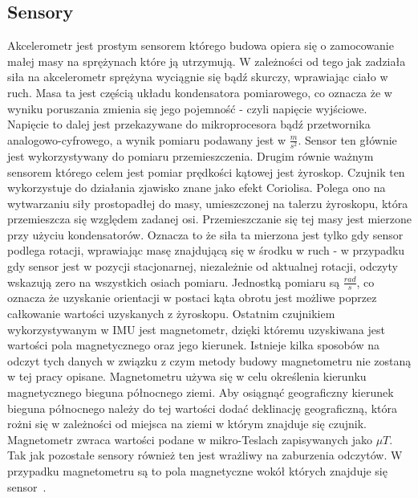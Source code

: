 		\subsection{Sensory}
		\label{subsec:sensory}
		Akcelerometr jest prostym sensorem którego budowa opiera się o zamocowanie małej masy na sprężynach które ją utrzymują. W zależności od tego jak zadziała siła na akcelerometr sprężyna wyciągnie się bądź skurczy, wprawiając ciało w ruch. Masa ta jest częścią układu kondensatora pomiarowego, co oznacza że w wyniku poruszania zmienia się jego pojemność - czyli napięcie wyjściowe. Napięcie to dalej jest przekazywane do mikroprocesora bądź przetwornika analogowo-cyfrowego, a wynik pomiaru podawany jest w {\Large$\frac{m}{s^2}$}. Sensor ten głównie jest wykorzystywany do pomiaru przemieszczenia. Drugim równie ważnym sensorem którego celem jest pomiar prędkości kątowej jest żyroskop. Czujnik ten wykorzystuje do działania zjawisko znane jako efekt Coriolisa. Polega ono na wytwarzaniu siły prostopadłej do masy, umieszczonej na talerzu żyroskopu, która przemieszcza się względem zadanej osi. Przemieszczanie się tej masy jest mierzone przy użyciu kondensatorów. Oznacza to że siła ta mierzona jest tylko gdy sensor podlega rotacji, wprawiając masę znajdującą się w środku w ruch - w przypadku gdy sensor jest w pozycji stacjonarnej, niezależnie od aktualnej rotacji, odczyty wskazują zero na wszystkich osiach pomiaru. Jednostką pomiaru są {\Large $\frac{rad}{s}$}, co oznacza że uzyskanie orientacji w postaci kąta obrotu jest możliwe poprzez całkowanie wartości uzyskanych z żyroskopu. Ostatnim czujnikiem wykorzystywanym w IMU jest magnetometr, dzięki któremu uzyskiwana jest wartości pola magnetycznego oraz jego kierunek. Istnieje kilka sposobów na odczyt tych danych w związku z czym metody budowy magnetometru nie zostaną w tej pracy opisane. Magnetometru używa się w celu określenia kierunku magnetycznego bieguna północnego ziemi. Aby osiągnąć geograficzny kierunek bieguna północnego należy do tej wartości dodać deklinację geograficzną, która rożni się w zależności od miejsca na ziemi w którym znajduje się czujnik. Magnetometr zwraca wartości podane w mikro-Teslach zapisywanych jako $\mu T$. Tak jak pozostałe sensory również ten jest wrażliwy na zaburzenia odczytów. W przypadku magnetometru są to pola magnetyczne wokół których znajduje się sensor~\cite{bSensory}.
